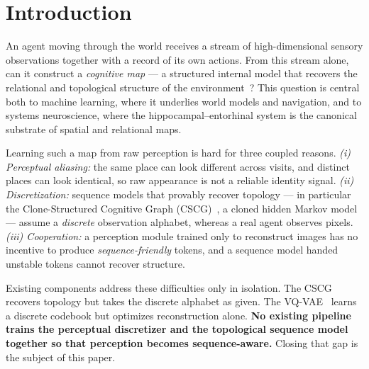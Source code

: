 \documentclass[twocolumn,10pt]{article}
\begin{document}
\section{Introduction}
\label{sec:intro}

An agent moving through the world receives a stream of high-dimensional
sensory observations together with a record of its own actions. From this
stream alone, can it construct a \emph{cognitive map} --- a structured
internal model that recovers the relational and topological structure of the
environment~\cite{tolman1948}? This question is central both to machine
learning, where it underlies world models and navigation, and to systems
neuroscience, where the hippocampal--entorhinal system is the canonical
substrate of spatial and relational maps.

Learning such a map from raw perception is hard for three coupled reasons.
\emph{(i) Perceptual aliasing:} the same place can look different across
visits, and distinct places can look identical, so raw appearance is not a
reliable identity signal. \emph{(ii) Discretization:} sequence models that
provably recover topology --- in particular the Clone-Structured Cognitive
Graph (CSCG)~\cite{george2021}, a cloned hidden Markov model --- assume a
\emph{discrete} observation alphabet, whereas a real agent observes pixels.
\emph{(iii) Cooperation:} a perception module trained only to reconstruct
images has no incentive to produce \emph{sequence-friendly} tokens, and a
sequence model handed unstable tokens cannot recover structure.

Existing components address these difficulties only in isolation. The CSCG
recovers topology but takes the discrete alphabet as given. The
VQ-VAE~\cite{oord2017,razavi2019} learns a discrete codebook but optimizes
reconstruction alone. \textbf{No existing pipeline trains the perceptual
discretizer and the topological sequence model together so that perception
becomes sequence-aware.} Closing that gap is the subject of this paper.
\end{document}
